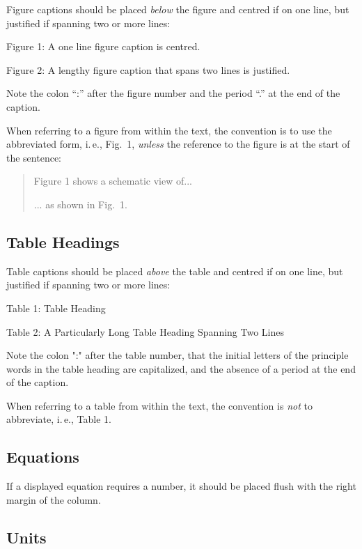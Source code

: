 Figure captions should be placed \emph{below} the figure and
centred if on one line, but justified if spanning two or
more lines:
\begin{center}
	Figure 1: A one line figure caption is centred.
\end{center}
\begin{justify}
	Figure 2: A lengthy figure caption that spans
	two lines is justified.
\end{justify}
Note the colon “:” after the figure number and the period
“.” at the end of the caption.

When referring to a figure from within the text, the
convention is to use the abbreviated form, i.\,e., Fig.~1,
\emph{unless} the reference to the figure is at the start of the sentence:
\begin{quote}
	Figure 1 shows a schematic view of...
	
	... as shown in Fig.~1.
\end{quote}

\subsection{Table Headings}

Table captions should be placed \emph{above} the table and
centred if on one line, but justified if spanning two or
more lines:
\begin{center}
	Table 1: Table Heading
\end{center}
\begin{justify}
	Table 2: A Particularly Long Table Heading
	Spanning Two Lines
\end{justify}

Note the colon ":" after the table number, that the initial
letters of the principle words in the table heading are
capitalized, and the absence of a period at the end of the
caption.

When referring to a table from within the text, the convention
is \emph{not} to abbreviate, i.\,e., Table 1.

\subsection{Equations}

If a displayed equation requires a number, it should be
placed flush with the right margin of the column. 

\subsection{Units}

